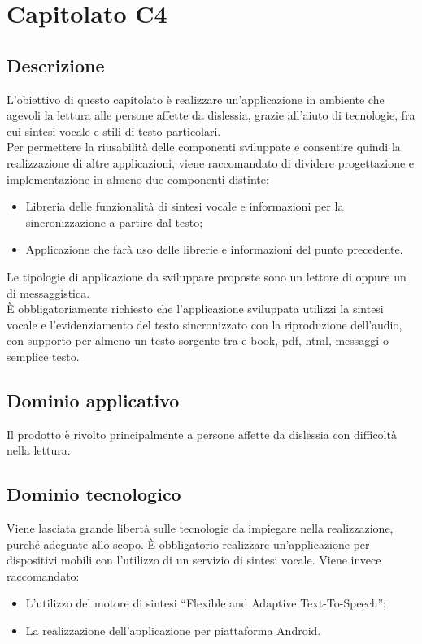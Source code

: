 \documentclass[../StudioDiFattibilita.tex]{subfiles}
\begin{document}
	\section{Capitolato C4}
		\subsection{Descrizione}
			L'obiettivo di questo capitolato è realizzare un'applicazione in ambiente  che agevoli la
			lettura alle persone affette da dislessia, grazie all'aiuto di tecnologie, fra cui
			sintesi vocale e stili di testo particolari.\\
			Per permettere la riusabilità delle componenti sviluppate e consentire quindi la realizzazione di
			altre applicazioni, viene raccomandato di dividere progettazione e implementazione in almeno due
			componenti distinte:
			\begin{itemize}
				\item Libreria delle funzionalità di sintesi vocale e informazioni per la sincronizzazione a
				partire dal testo;
				\item Applicazione che farà uso delle librerie e informazioni del punto precedente.
			\end{itemize}
			Le tipologie di applicazione da sviluppare proposte sono un lettore di  oppure un
			 di messaggistica.\\
			È obbligatoriamente richiesto che l'applicazione sviluppata utilizzi la sintesi vocale e
			l'evidenziamento del testo sincronizzato con la riproduzione dell'audio, con supporto per almeno un
			testo sorgente tra e-book, pdf, html, messaggi o semplice testo.
		\subsection{Dominio applicativo}
			Il prodotto è rivolto principalmente a persone affette da dislessia con difficoltà nella lettura.
		\subsection{Dominio tecnologico}
			Viene lasciata grande libertà sulle tecnologie da impiegare nella realizzazione, purché adeguate allo
			scopo. È obbligatorio realizzare un'applicazione per dispositivi mobili con l'utilizzo di un servizio
			di sintesi vocale. Viene invece raccomandato:
			\begin{itemize}
				\item L'utilizzo del motore di sintesi ``Flexible and Adaptive Text-To-Speech'';
				\item La realizzazione dell'applicazione per piattaforma Android.
			\end{itemize}
\end{document}
